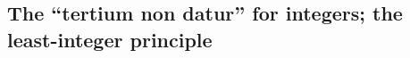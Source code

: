 \paragraph{} %

\paragraph{} %

\paragraph{} %

\paragraph{} %

\paragraph{} %

\paragraph{} %

\paragraph{} %

\paragraph{} %

\paragraph{} %

\paragraph{} %

\paragraph{} %

\subsection{The ``tertium non datur'' for integers; the least-integer principle}

